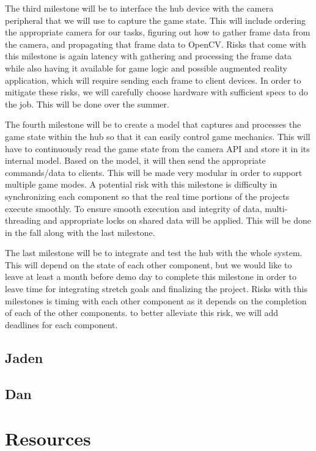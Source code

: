\documentclass[11pt]{ieeeconf}
\begin{document}
The third milestone will be to interface the hub device with the camera peripheral that we will use to capture the game state. This will include ordering the appropriate camera for our tasks, figuring out how to gather frame data from the camera, and propagating that frame data to OpenCV. Risks that come with this milestone is again latency with gathering and processing the frame data while also having it available for game logic and possible augmented reality application, which will require sending each frame to client devices. In order to mitigate these risks, we will carefully choose hardware with sufficient specs to do the job. This will be done over the summer.

The fourth milestone will be to create a model that captures and processes the game state within the hub so that it can easily control game mechanics. This will have to continuously read the game state from the camera API and store it in its internal model. Based on the model, it will then send the appropriate commands/data to clients. This will be made very modular in order to support multiple game modes. A potential risk with this milestone is difficulty in synchronizing each component so that the real time portions of the projects execute smoothly. To ensure smooth execution and integrity of data, multi-threading and appropriate locks on shared data will be applied. This will be done in the fall along with the last milestone.

The last milestone will be to integrate and test the hub with the whole system. This will depend on the state of each other component, but we would like to leave at least a month before demo day to complete this milestone in order to leave time for integrating stretch goals and finalizing the project. Risks with this milestones is timing with each other component as it depends on the completion of each of the other components. to better alleviate this risk, we will add deadlines for each component.  

\subsection{Jaden}

\subsection{Dan}

\section{Resources}
\end{document}
